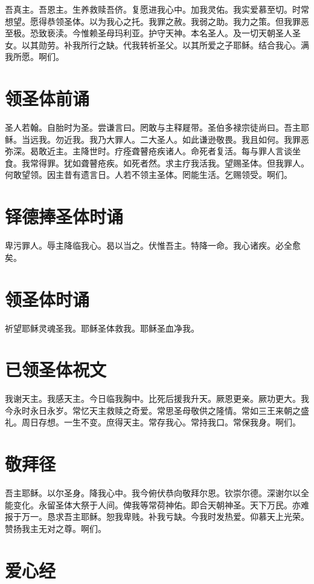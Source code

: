 \documentclass[UTF8,17pt]{ctexart}
\begin{document}
吾真主。吾恩主。⽣养救赎吾侪。复愿进我⼼中。加我灵佑。我实爱慕⾄切。时常想望。愿得恭领圣体。以为我⼼之托。我罪之赦。我弱之助。我⼒之策。但我罪恶⾄极。恐致亵渎。今惟赖圣母玛利亚。护守天神。本名圣⼈。及⼀切天朝圣⼈圣⼥。以其勋劳。补我所⾏之缺。代我转祈圣⽗。以其所爱之⼦耶稣。结合我⼼。满我所愿。啊们。

\section{领圣体前诵}

圣⼈若翰。⾃胎时为圣。尝谦⾔曰。罔敢与主释屣带。圣伯多禄宗徒尚曰。吾主耶稣。当远我。勿近我。我乃⼤罪⼈。⼆⼤圣⼈。如此谦逊敬畏。我且如何。我罪恶弥深。曷敢近主。主降世时。疗痊聋瞽疮疾诸⼈。命死者复活。每与罪⼈⾔谈坐⾷。我常得罪。犹如聋瞽疮疾。如死者然。求主疗我活我。望赐圣体。但我罪⼈。何敢望领。因主昔有遗⾔⽇。⼈若不领主圣体。罔能⽣活。乞赐领受。啊们。

\section{铎德捧圣体时诵}

卑污罪⼈。辱主降临我⼼。曷以当之。伏惟吾主。特降⼀命。我⼼诸疾。必全愈矣。

\section{领圣体时诵}

祈望耶稣灵魂圣我。耶稣圣体救我。耶稣圣⾎净我。

\section{已领圣体祝⽂}

我谢天主。我感天主。今⽇临我胸中。⽐死后援我升天。厥恩更亲。厥功更⼤。我今永时永⽇永岁。常忆天主救赎之奇爱。常思圣母敬供之隆情。常如三王来朝之盛礼。周⽇存想。⼀⽣不变。庶得天主。常存我⼼。常持我口。常保我⾝。啊们。

\section{敬拜径}

吾主耶稣。以尔圣⾝。降我⼼中。我今俯伏恭向敬拜尔恩。钦崇尔德。深谢尔以全能变化。永留圣体⼤祭于⼈间。俾我等常荷神佑。即合天朝神圣。天下万民。亦难报于万⼀。恳求吾主耶稣。恕我卑贱。补我亏缺。今我时发热爱。仰慕天上光荣。赞扬我主⽆对之尊。啊们。

\section{爱⼼经}
\end{document}
